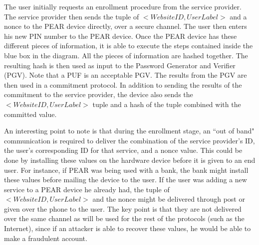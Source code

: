The user initially requests an enrollment procedure from the service provider. The service provider then sends the tuple
of $<Website ID, User Label>$ and a nonce to the PEAR device directly, over a secure channel. The user then enters his
new PIN number to the PEAR device. Once the PEAR device has these different pieces of information, it is able to execute
the steps contained inside the blue box in the diagram. All the pieces of information are hashed together. The resulting
hash is then used as input to the Password Generator and Verifier (PGV). Note that a PUF is an acceptable PGV. The results
from the PGV are then used in a commitment protocol. In addition to sending the results of the commitment to the service
provider, the device also sends the $<Website ID, User Label>$ tuple and a hash of the tuple combined with the committed value.

An interesting point to note is that during the enrollment stage, an ``out of band" communication is required to deliver
the combination of the service provider's ID, the user's corresponding ID for that service, and a nonce value. This could
be done by installing these values on the hardware device before it is given to an end user. For instance, if PEAR was being
used with a bank, the bank might install these values before mailing the device to the user. If the user was adding a new
service to a PEAR device he already had, the tuple of $<Website ID, User Label>$ and the nonce might be delivered through
post or given over the phone to the user. The key point is that they are not delivered over the same channel as will be
used for the rest of the protocols (such as the Internet), since if an attacker is able to recover these values, he would
be able to make a fraudulent account.

